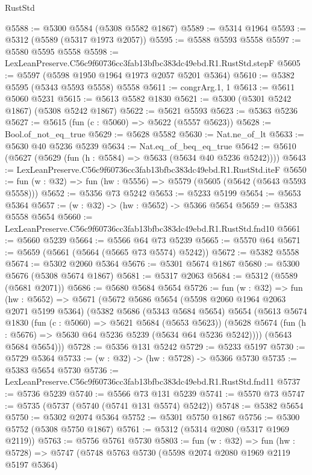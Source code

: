 \begin{lexlean}{RustStd}
\begin{coremodule}
@5588 := @5300 @5584 (@5308 @5582 @1867)
@5589 := @5314 @1964
@5593 := @5312 (@5589 (@5317 @1973 @2057))
@5595 := @5588 @5593 @5558
@5597 := @5580 @5595 @5558
@5598 := LexLeanPreserve.C56c9f60736cc3fab13bfbc383dc49ebd.R1.RustStd.stepF
@5605 := @5597 (@5598 @1950 @1964 @1973 @2057 @5201 @5364)
@5610 := @5382 @5595 (@5343 @5593 @5558) @5558
@5611 := congrArg.{1, 1}
@5613 := @5611 @5060 @5231
@5615 := @5613 @5582 @1830
@5621 := @5300 (@5301 @5242 @1867) (@5308 @5242 @1867)
@5622 := @5621 @5593
@5623 := @5363 @5236
@5627 := @5615 (fun (c : @5060) => @5622 (@5557 @5623))
@5628 := Bool.of_not_eq_true
@5629 := @5628 @5582
@5630 := Nat.ne_of_lt
@5633 := @5630 @40 @5236 @5239
@5634 := Nat.eq_of_beq_eq_true
@5642 := @5610 (@5627 (@5629 (fun (h : @5584) => @5633 (@5634 @40 @5236 @5242))))
@5643 := LexLeanPreserve.C56c9f60736cc3fab13bfbc383dc49ebd.R1.RustStd.iteF
@5650 := fun (w : @32) => fun (hw : @5556) => @5579 (@5605 (@5642 (@5643 @5593 @5558)))
@5652 := @5356 @73 @5242
@5653 := @5233 @5199
@5654 := @5653 @5364
@5657 := (w : @32) -> (hw : @5652) -> @5366 @5654
@5659 := @5383 @5558 @5654
@5660 := LexLeanPreserve.C56c9f60736cc3fab13bfbc383dc49ebd.R1.RustStd.fnd10
@5661 := @5660 @5239
@5664 := @5566 @64 @73 @5239
@5665 := @5570 @64
@5671 := @5659 (@5661 (@5664 (@5665 @73 @5574) @5242))
@5672 := @5382 @5558
@5674 := @5302 @2060 @5364
@5676 := @5301 @5674 @1867
@5680 := @5300 @5676 (@5308 @5674 @1867)
@5681 := @5317 @2063
@5684 := @5312 (@5589 (@5681 @2071))
@5686 := @5680 @5684 @5654
@5726 := fun (w : @32) =>
  fun (hw : @5652) =>
  @5671
    (@5672
      @5686
      @5654
      (@5598 @2060 @1964 @2063 @2071 @5199 @5364)
      (@5382
        @5686
        (@5343 @5684 @5654)
        @5654
        (@5613
          @5674
          @1830
          (fun (c : @5060) => @5621 @5684 (@5653 @5623))
          (@5628 @5674 (fun (h : @5676) => @5630 @64 @5236 @5239 (@5634 @64 @5236 @5242))))
        (@5643 @5684 @5654)))
@5728 := @5356 @131 @5242
@5729 := @5233 @5197
@5730 := @5729 @5364
@5733 := (w : @32) -> (hw : @5728) -> @5366 @5730
@5735 := @5383 @5654 @5730
@5736 := LexLeanPreserve.C56c9f60736cc3fab13bfbc383dc49ebd.R1.RustStd.fnd11
@5737 := @5736 @5239
@5740 := @5566 @73 @131 @5239
@5741 := @5570 @73
@5747 := @5735 (@5737 (@5740 (@5741 @131 @5574) @5242))
@5748 := @5382 @5654
@5750 := @5302 @2074 @5364
@5752 := @5301 @5750 @1867
@5756 := @5300 @5752 (@5308 @5750 @1867)
@5761 := @5312 (@5314 @2080 (@5317 @1969 @2119))
@5763 := @5756 @5761 @5730
@5803 := fun (w : @32) =>
  fun (hw : @5728) =>
  @5747
    (@5748
      @5763
      @5730
      (@5598 @2074 @2080 @1969 @2119 @5197 @5364)

\end{coremodule}
\end{lexlean}
